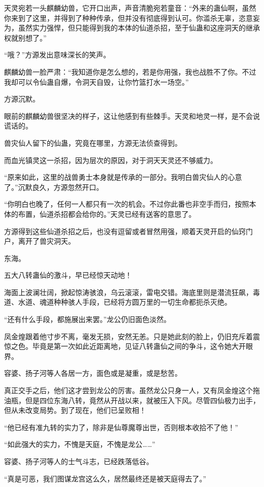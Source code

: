 \begin{this_body}
天灵宛若一头麒麟幼兽，它开口出声，声音清脆宛若童音：“外来的蛊仙啊，虽然你来到了这里，并得到了种种传承，但并没有彻底得到认可。你滥杀无辜，恣意妄为，虽然实力强悍，但只能得到我的本体的仙道杀招，至于仙蛊和这座洞天的继承权就别想了。”

“哦？”方源发出意味深长的笑声。

麒麟幼兽一脸严肃：“我知道你是怎么想的，若是你用强，我也战胜不了你。不过我却可以令仙蛊自爆，令洞天自毁，让你竹篮打水一场空。”

方源沉默。

眼前的麒麟幼兽很坚决的样子，这让他感到有些棘手。天灵和地灵一样，是不会说谎话的。

兽灾仙人留下的仙蛊，究竟在哪里，方源无法侦查得到。

而血光镇灵这一杀招，因为层次的原因，对于洞天天灵还不够威力。

“原来如此，这里的战兽勇士本身就是传承的一部分。我明白兽灾仙人的心意了。”沉默良久，方源忽然开口。

“你明白也晚了，任何一人都只有一次的机会。不过你此番也非空手而归，按照本体的布置，仙道杀招都会给你的。”天灵已经有送客的意思了。

方源得到这些仙道杀招之后，也没有逗留或者冒然用强，顺着天灵开启的仙窍门户，离开了兽灾洞天。

东海。

五大八转蛊仙的激斗，早已经惊天动地！

海面上波澜壮阔，掀起惊涛骇浪，乌云滚滚，雷电交错。海底里则是潜流狂飙，毒道、水道、魂道种种骇人手段，已经将方圆万里的一切生命都扼杀灭绝。

“还有什么手段，都施展出来罢。”龙公仍旧面色淡然。

凤金煌跟着他寸步不离，毫发无损，安然无恙。只是她此刻的脸上，仍旧充斥着震惊之色。毕竟是第一次如此近距离地，见证八转蛊仙之间的争斗，这令她大开眼界。

容婆、扬子河等人各居一方，面色或是凝重，或是愁苦。

真正交手之后，他们这才尝到龙公的厉害。虽然龙公只身一人，又有凤金煌这个拖油瓶，但是四位东海八转，竟然从开战以来，就被压入下风。尽管四仙极力出手，但从未改变局势。到了现在，他们已呈败相！

“他已经有准九转的实力了，除非是仙尊魔尊出世，否则根本收拾不了他！”

“如此强大的实力，不愧是天庭，不愧是龙公……”

容婆、扬子河等人的士气斗志，已经跌落低谷。

“真是可恶，我们图谋龙宫这么久，居然最终还是被天庭得去了。”


\end{this_body}
